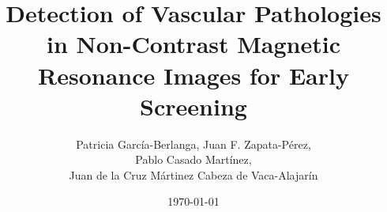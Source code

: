 \documentclass[12pt]{article}
\title{Detection of Vascular Pathologies in Non-Contrast Magnetic Resonance Images for Early Screening} %
\author{Patricia García-Berlanga, Juan F. Zapata-Pérez, \\ 
        Pablo Casado Martínez, \\ 
        Juan de la Cruz Mártinez Cabeza de Vaca-Alajarín}
\date{\today}
\begin{document}
\maketitle

\abstract{



}
\end{document}
